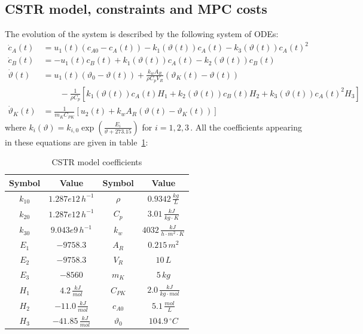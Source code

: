 \documentclass[12pt]{article}
\begin{document}
\subsection{CSTR model, constraints and MPC costs}\label{sec:cstr-model}
\noindent The evolution of the system is described by the following system of ODEs:
\begin{align*}
	\dot{c}_A(t)&=u_1(t)(c_{A0}-c_A(t))-k_1(\vartheta(t))c_A(t)-k_3(\vartheta(t))c_A(t)^2\\
	\dot{c}_B(t)&=-u_1(t)c_B(t)+k_1(\vartheta(t))c_A(t)-k_2(\vartheta(t))c_B(t)\\
	\dot{\vartheta}(t)&=u_1(t)(\vartheta_0-\vartheta(t))+\frac{k_wA_R}{\rho C_pV_R}(\vartheta_K(t)-\vartheta(t))\\
	&\qquad-\frac{1}{\rho C_p}\left[ k_1(\vartheta(t))c_A(t)H_1+k_2(\vartheta(t))c_B(t)H_2 +k_3(\vartheta(t))c_A(t)^2H_3\right]\\
	\dot{\vartheta}_K(t)&=\frac{1}{m_KC_{PK}}\left[ u_2(t)+k_wA_R(\vartheta(t)-\vartheta_K(t)) \right]
\end{align*}
where $k_i(\vartheta)=k_{i,0}\exp\left(\frac{E_i}{\vartheta+273.15}\right)$ for $i=1,2,3$\,.
All the coefficients appearing in these equations are given in table~\ref{tab:cstr-model-coefficients}:
\begin{table}[H]
	\centering
	\begin{tabular}{|c|c||c|c|}
		\hline
		Symbol&Value&Symbol&Value\\
		\hline
		$k_{10}$ & $1.287e12\,h^{-1}$ & $\rho$ & $0.9342\,\frac{kg}{L}$\\
		$k_{20}$ & $1.287e12\,h^{-1}$ & $C_p$ & $3.01\,\frac{kJ}{kg\cdot K}$\\
		$k_{30}$ & $9.043e9\,h^{-1}$ & $k_w$ & $4032\,\frac{kJ}{h\cdot m^2\cdot K}$\\
		$E_{1}$ & $-9758.3$ & $A_R$ & $0.215\,m^2$\\
		$E_{2}$ & $-9758.3$ & $V_R$ & $10\,L$\\
		$E_{3}$ & $-8560$ & $m_K$ & $5\,kg$\\
		$H_{1}$ & $4.2\,\frac{kJ}{mol}$ & $C_{PK}$ & $2.0\,\frac{kJ}{kg\cdot mol}$\\
		$H_{2}$ & $-11.0\,\frac{kJ}{mol}$ & $c_{A0}$ & $5.1\,\frac{mol}{L}$\\
		$H_{3}$ & $-41.85\,\frac{kJ}{mol}$ & $\vartheta_0$ & $104.9\,^\circ C$\\
		\hline
	\end{tabular}
	\caption{CSTR model coefficients}
	\label{tab:cstr-model-coefficients}
\end{table}
\end{document}
